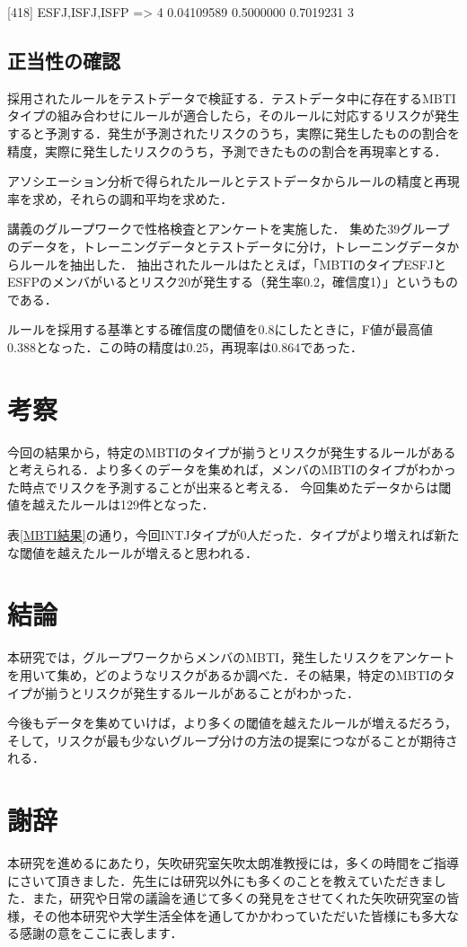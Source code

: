 [418] {ESFJ,ISFJ,ISFP}      => {4}  0.04109589 0.5000000  0.7019231  3 

\newpage

\section{正当性の確認}
採用されたルールをテストデータで検証する．テストデータ中に存在するMBTIタイプの組み合わせにルールが適合したら，そのルールに対応するリスクが発生すると予測する．発生が予測されたリスクのうち，実際に発生したものの割合を精度，実際に発生したリスクのうち，予測できたものの割合を再現率とする．

アソシエーション分析で得られたルールとテストデータからルールの精度と再現率を求め，それらの調和平均を求めた．

講義のグループワークで性格検査とアンケートを実施した．
集めた39グループのデータを，トレーニングデータとテストデータに分け，トレーニングデータからルールを抽出した．
抽出されたルールはたとえば，「MBTIのタイプESFJとESFPのメンバがいるとリスク20が発生する（発生率0.2，確信度1）」というものである．

ルールを採用する基準とする確信度の閾値を0.8にしたときに，F値が最高値0.388となった．この時の精度は0.25，再現率は0.864であった．

\newpage


\chapter{考察}
今回の結果から，特定のMBTIのタイプが揃うとリスクが発生するルールがあると考えられる．より多くのデータを集めれば，メンバのMBTIのタイプがわかった時点でリスクを予測することが出来ると考える．
今回集めたデータからは閾値を越えたルールは129件となった．

表\ref{MBTI結果}の通り，今回INTJタイプが0人だった．タイプがより増えれば新たな閾値を越えたルールが増えると思われる．
\newpage
\chapter{結論}
本研究では，グループワークからメンバのMBTI，発生したリスクをアンケートを用いて集め，どのようなリスクがあるか調べた．その結果，特定のMBTIのタイプが揃うとリスクが発生するルールがあることがわかった．

今後もデータを集めていけば，より多くの閾値を越えたルールが増えるだろう，そして，リスクが最も少ないグループ分けの方法の提案につながることが期待される．
\newpage


\chapter*{謝辞}
本研究を進めるにあたり，矢吹研究室矢吹太朗准教授には，多くの時間をご指導にさいて頂きました．先生には研究以外にも多くのことを教えていただきました．また，研究や日常の議論を通じて多くの発見をさせてくれた矢吹研究室の皆様，その他本研究や大学生活全体を通してかかわっていただいた皆様にも多大なる感謝の意をここに表します．


\newpage

